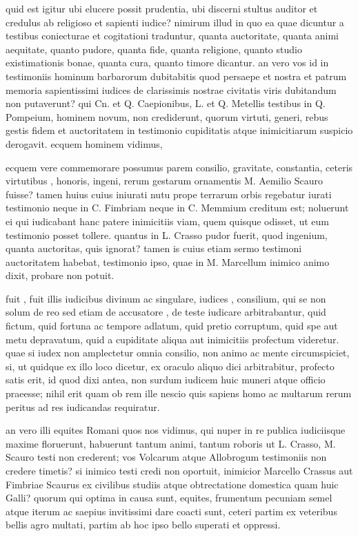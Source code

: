  quid est igitur ubi elucere possit prudentia, ubi discerni stultus auditor et credulus ab religioso et sapienti iudice? nimirum illud in quo ea quae dicuntur a testibus coniecturae et cogitationi traduntur, quanta auctoritate, quanta animi aequitate, quanto pudore, quanta fide, quanta religione, quanto studio existimationis bonae, quanta cura, quanto timore dicantur. an vero vos id in testimoniis hominum barbarorum dubitabitis quod persaepe et nostra et patrum memoria sapientissimi iudices de clarissimis nostrae civitatis viris dubitandum non putaverunt? qui Cn. et Q. Caepionibus, L. et Q. Metellis testibus in Q. Pompeium, hominem novum, non crediderunt, quorum virtuti, generi, rebus gestis fidem et auctoritatem in testimonio cupiditatis atque inimicitiarum suspicio derogavit. ecquem hominem vidimus,

 ecquem vere commemorare possumus parem consilio, gravitate, constantia, ceteris virtutibus , honoris, ingeni, rerum gestarum ornamentis M. Aemilio Scauro fuisse? tamen huius cuius iniurati nutu prope terrarum orbis regebatur iurati testimonio neque in C. Fimbriam neque in C. Memmium creditum est; noluerunt ei qui iudicabant hanc patere inimicitiis viam, quem quisque odisset, ut eum testimonio posset tollere. quantus in L. Crasso pudor fuerit, quod ingenium, quanta auctoritas, quis ignorat? tamen is cuius etiam sermo testimoni auctoritatem habebat, testimonio ipso, quae in M. Marcellum inimico animo dixit, probare non potuit.

 fuit , fuit illis iudicibus divinum ac singulare, iudices , consilium, qui se non solum de reo sed etiam de accusatore , de teste iudicare arbitrabantur, quid fictum, quid fortuna ac tempore adlatum, quid pretio corruptum, quid spe aut metu depravatum, quid a cupiditate aliqua aut inimicitiis profectum videretur. quae si iudex non amplectetur omnia consilio, non animo ac mente circumspiciet, si, ut quidque ex illo loco dicetur, ex oraculo aliquo dici arbitrabitur, profecto satis erit, id quod dixi antea, non surdum iudicem huic muneri atque officio praeesse; nihil erit quam ob rem ille nescio quis sapiens homo ac multarum rerum peritus ad res iudicandas requiratur.

 an vero illi equites Romani quos nos vidimus, qui nuper in re publica iudiciisque maxime floruerunt, habuerunt tantum animi, tantum roboris ut L. Crasso, M. Scauro testi non crederent; vos Volcarum atque Allobrogum testimoniis non credere timetis? si inimico testi credi non oportuit, inimicior Marcello Crassus aut Fimbriae Scaurus ex civilibus studiis atque obtrectatione domestica quam huic Galli? quorum qui optima in causa sunt, equites, frumentum pecuniam semel atque iterum ac saepius invitissimi dare coacti sunt, ceteri partim ex veteribus bellis agro multati, partim ab hoc ipso bello superati et oppressi.

